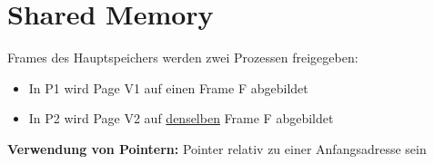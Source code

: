 \section{Shared Memory}
Frames des Hauptspeichers werden zwei Prozessen freigegeben:
\begin{itemize}
    \item In P1 wird Page V1 auf einen Frame F abgebildet
    \item In P2 wird Page V2 auf \underline{denselben} Frame F abgebildet
\end{itemize}
\textbf{Verwendung von Pointern: }Pointer relativ zu einer Anfangsadresse sein






